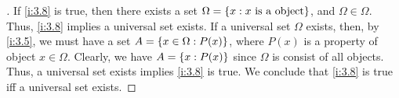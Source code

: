 \begin{proof}[]
  If \cref{i:3.8} is true, then there exists a set \(\Omega = \left\lbrace x : x \text{ is a object}\right\rbrace\), and \(\Omega \in \Omega\).
  Thus, \cref{i:3.8} implies a universal set exists.
  If a universal set \(\Omega\) exists, then, by \cref{i:3.5}, we must have a set \(A = \left\lbrace x \in \Omega : P(x)\right\rbrace\), where \(P(x)\) is a property of object \(x \in \Omega\).
  Clearly, we have \(A = \left\lbrace x : P(x)\right\rbrace\) since \(\Omega\) is consist of all objects.
  Thus, a universal set exists implies \cref{i:3.8} is true.
  We conclude that \cref{i:3.8} is true iff a universal set exists.
\end{proof}
